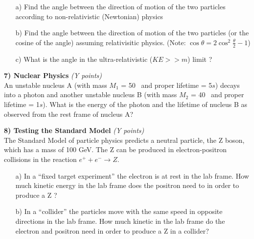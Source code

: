 {\begin{itemize}
\item[a)]Find the angle between the direction of motion of the two particles according to non-relativistic (Newtonian) physics 

\vspace{3.in}

\item[b)]Find the angle between the direction of motion of the two particles (or the cosine of the angle) assuming relativisitic physics. (Note: $\cos \theta = 2 \cos^2 \frac{\theta}{2} - 1$)

\vspace{3in}

\item[c)]What is the angle in the ultra-relativistic  ($KE >> m$) limit ? 

\end{itemize}



\clearpage



\textbf{7) Nuclear Physics }\hfill \textit{(Y points)}\\

An unstable nucleus A (with mass $M_1$ = 50 \GeV\ and proper lifetime = 5$s$) decays into a photon and another unstable nucleus B (with mass $M_2$ = 40 \GeV\ and proper lifetime = 1$s$).
What is the energy of the photon and the lifetime of nucleus B as observed from the rest frame of nucleus A?


\clearpage
\textbf{8) Testing the Standard Model }\hfill \textit{(Y points)}\\
The Standard Model of particle physics predicts a neutral particle, the Z boson, which has a mass of 100 GeV.
The Z can be produced in electron-positron collisions in the reaction $e^+ + e^- \rightarrow Z$.

\begin{itemize}
\item[a)]In a ``fixed target experiment'' the electron is at rest in the lab frame. 
How much kinetic energy in the lab frame does the positron need to in order to produce a Z ?

\vspace{3.75in}

\item[b)] In a ``collider'' the particles move with the same speed in opposite directions in the lab frame.
How much kinetic in the lab frame do the electron and positron need in order to produce a Z in a collider?
\end{itemize}


} %

